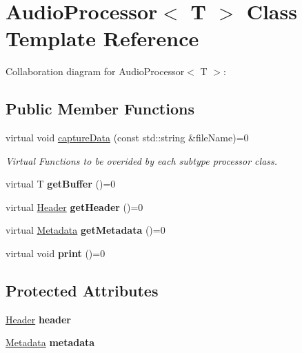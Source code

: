\hypertarget{classAudioProcessor}{}\section{Audio\+Processor$<$ T $>$ Class Template Reference}
\label{classAudioProcessor}


Collaboration diagram for Audio\+Processor$<$ T $>$\+:
\subsection*{Public Member Functions}
\begin{DoxyCompactItemize}
\item 
virtual void \hyperlink{classAudioProcessor_a0d6d6ef552e671405150d2cfbd4095c5}{capture\+Data} (const std\+::string \&file\+Name)=0
\begin{DoxyCompactList}\small\item\em Virtual Functions to be overided by each subtype processor class. \end{DoxyCompactList}\item 
\mbox{\label{classAudioProcessor_af5656baf5d5c7d1b4ff07ce8d31f65a8}} 
virtual T {\bfseries get\+Buffer} ()=0
\item 
\mbox{\label{classAudioProcessor_a308cb04c6cbe75a29bcea27a4505fb6b}} 
virtual \hyperlink{structHeader}{Header} {\bfseries get\+Header} ()=0
\item 
\mbox{\label{classAudioProcessor_a944d36fd87e848a52ae59cecd2cfa66e}} 
virtual \hyperlink{structMetadata}{Metadata} {\bfseries get\+Metadata} ()=0
\item 
\mbox{\label{classAudioProcessor_ae83737710cbf3e05bdbae7efbc3044ea}} 
virtual void {\bfseries print} ()=0
\end{DoxyCompactItemize}
\subsection*{Protected Attributes}
\begin{DoxyCompactItemize}
\item 
\mbox{\label{classAudioProcessor_ae794bfb68c80671f7fceefb9cb4b4002}} 
\hyperlink{structHeader}{Header} {\bfseries header}
\item 
\mbox{\label{classAudioProcessor_a14643b98d14390402a0315b6d02a749d}} 
\hyperlink{structMetadata}{Metadata} {\bfseries metadata}
\end{DoxyCompactItemize}


